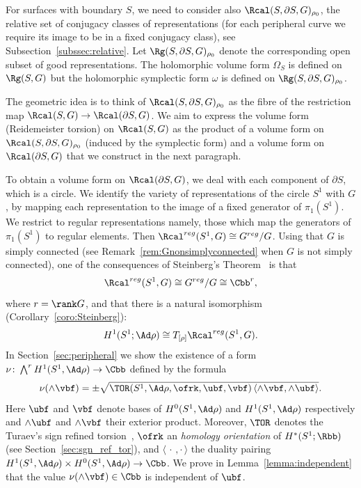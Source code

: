 For surfaces with boundary $S$, we need to consider also $\Rcal(S,\partial S,G)_{\rho_0}$, the relative set of conjugacy classes of representations (for each peripheral curve we require its image to be in a fixed conjugacy class), see Subsection~\ref{subssec:relative}. Let $\Rg(S,\partial S,G)_{\rho_0}$ denote the corresponding open subset of good representations. The holomorphic volume form $\Omega_S$ is defined on $\Rg(S,G)$ but the holomorphic symplectic form $\omega$ is defined on $\Rg(S,\partial S,G)_{\rho_0}$.

The geometric idea is to think of $\Rcal(S,\partial S,G)_{\rho_0}$ as the fibre of the restriction map $\Rcal(S,G)\to \Rcal(\partial S,G)$. We aim to express the volume form (Reidemeister torsion) on $\Rcal(S,G)$ as the product of a volume form on $\Rcal(S,\partial S,G)_{\rho_0}$ (induced by the symplectic form) and a volume form on $\Rcal(\partial S,G)$ that we construct in the next paragraph.

To obtain a volume form on $\Rcal(\partial S,G)$, we deal with each component of $\partial S$, which is a circle. We identify the variety of representations of the circle $S^1$ with $G$, by mapping each representation to the image of a fixed generator of $\pi_1(S^1)$. We restrict to regular representations namely, those which map the generators of $\pi_1(S^1)$ to regular elements. Then $
\Rcal^{reg}(S^1,G)\cong G^{reg}/ G $. Using that $G$ is simply connected (see Remark~\ref{rem:Gnonsimplyconnected} when $G$ is not simply connected), one of the consequences of Steinberg's Theorem~\cite{SteinbergIHES} is that
\[
\Rcal^{reg}(S^1,G)\cong G^{reg}/ G\cong \Cbb^r,
\]
where $r=\rank G$, and that there is a natural isomorphism (Corollary~\ref{coro:Steinberg}):
\[
H^1(S^1; \Ad\rho)\cong T_{ [\rho] } \Rcal^{reg}(S^1,G).
\]
In Section~\ref{sec:peripheral} we show the existence of a form $\nu\colon\bigwedge^{r} H^1(S^1,\Ad\rho)\to \Cbb$ defined by the formula
\begin{equation}\label{eqn:peripheral0}
\nu (\wedge\vbf)=\pm \sqrt{ \TOR(S^1,\Ad\rho, \ofrk,\ubf,\vbf)
\,\langle \wedge\vbf, \wedge\ubf \rangle }.
\end{equation}
Here $\ubf$ and $\vbf$ denote bases of $H^0(S^1,\Ad\rho)$ and $H^1(S^1,\Ad\rho) $ respectively and $\wedge\ubf$ and $\wedge \vbf$ their exterior product. Moreover, $\TOR$ denotes the Turaev's sign refined torsion~\cite[Section~3]{TuraevKnotTheory}, $\ofrk$ an \emph{homology orientation} of $H^*(S^1;\Rbb)$ (see Section~\ref{sec:sgn_ref_tor}), and $\langle\,\cdot\,,\cdot\,\rangle$ the duality pairing $ H^1(S^1,\Ad\rho)\times H^0(S^1,\Ad\rho)\to \Cbb$. We prove in Lemma~\ref{lemma:independent} that the value $\nu(\wedge\vbf)\in\Cbb$ is independent of $\ubf$.


